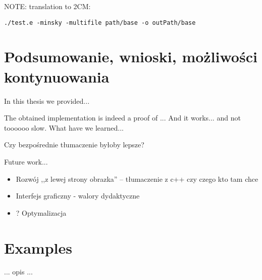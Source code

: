 \documentclass[english,shortabstract,mgr]{iithesis}
\begin{document}
NOTE: translation to 2CM:

\texttt{./test.e -minsky -multifile path/base -o outPath/base}

\chapter{Podsumowanie, wnioski, możliwości kontynuowania}


In this thesis we provided...

The obtained implementation is indeed a proof of ... And it works... and not toooooo slow. What have we learned...

Czy bezpośrednie tłumaczenie byłoby lepsze?


Future work...
\begin{itemize}
\item 
Rozwój ,,z lewej strony obrazka'' -- tłumaczenie z c++ czy czego kto tam chce
\item 
Interfejs graficzny - walory dydaktyczne
\item 
? Optymalizacja
\end{itemize}


{}

\newpage
\appendix

\chapter{Examples}

... opis ...
\end{document}
